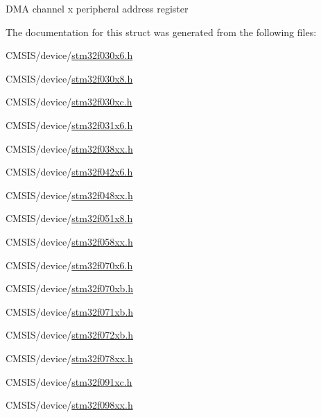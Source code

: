 D\+MA channel x peripheral address register 

The documentation for this struct was generated from the following files\+:\begin{DoxyCompactItemize}
\item 
C\+M\+S\+I\+S/device/\hyperlink{stm32f030x6_8h}{stm32f030x6.\+h}\item 
C\+M\+S\+I\+S/device/\hyperlink{stm32f030x8_8h}{stm32f030x8.\+h}\item 
C\+M\+S\+I\+S/device/\hyperlink{stm32f030xc_8h}{stm32f030xc.\+h}\item 
C\+M\+S\+I\+S/device/\hyperlink{stm32f031x6_8h}{stm32f031x6.\+h}\item 
C\+M\+S\+I\+S/device/\hyperlink{stm32f038xx_8h}{stm32f038xx.\+h}\item 
C\+M\+S\+I\+S/device/\hyperlink{stm32f042x6_8h}{stm32f042x6.\+h}\item 
C\+M\+S\+I\+S/device/\hyperlink{stm32f048xx_8h}{stm32f048xx.\+h}\item 
C\+M\+S\+I\+S/device/\hyperlink{stm32f051x8_8h}{stm32f051x8.\+h}\item 
C\+M\+S\+I\+S/device/\hyperlink{stm32f058xx_8h}{stm32f058xx.\+h}\item 
C\+M\+S\+I\+S/device/\hyperlink{stm32f070x6_8h}{stm32f070x6.\+h}\item 
C\+M\+S\+I\+S/device/\hyperlink{stm32f070xb_8h}{stm32f070xb.\+h}\item 
C\+M\+S\+I\+S/device/\hyperlink{stm32f071xb_8h}{stm32f071xb.\+h}\item 
C\+M\+S\+I\+S/device/\hyperlink{stm32f072xb_8h}{stm32f072xb.\+h}\item 
C\+M\+S\+I\+S/device/\hyperlink{stm32f078xx_8h}{stm32f078xx.\+h}\item 
C\+M\+S\+I\+S/device/\hyperlink{stm32f091xc_8h}{stm32f091xc.\+h}\item 
C\+M\+S\+I\+S/device/\hyperlink{stm32f098xx_8h}{stm32f098xx.\+h}\end{DoxyCompactItemize}

